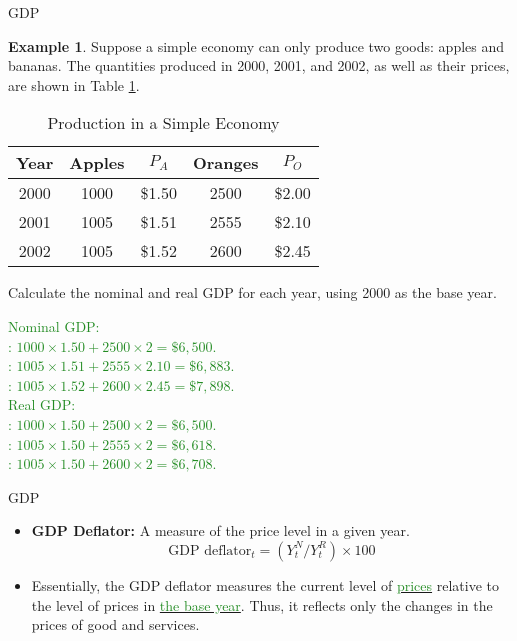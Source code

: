 \documentclass[xcolor={dvipsnames},pdf, hyperref={colorlinks=true, citecolor=ForestGreen, linkcolor=BlueViolet, urlcolor=Magenta}]{beamer}
\theoremstyle{definition}
\newtheorem{exmp}{Example}[section]
\newcommand{\defn}[1]{\textbf{#1}}
\newcommand{\ddp}[1]{{\textcolor{ForestGreen}{#1}}}
\newcommand{\dd}[1]{{\underline{\textcolor{ForestGreen}{#1}}}}
\begin{document}
\begin{frame}{GDP}
\begin{exmp}
	\tiny
	Suppose a simple economy can only produce two goods: apples and bananas. The quantities produced in 2000, 2001, and 2002, as well as their prices, are shown in Table \ref{simp}.
	
	\begin{table}[h!]
		\centering
		\caption{Production in a Simple Economy}
		\label{simp}
		\begin{tabular}{c|c|c|c|c}       
			
			Year & Apples & $P_A$ & Oranges & $P_O$  \\
			\hline
			2000 & 1000 & \$1.50 & 2500 & \$2.00 \\
			2001 & 1005 & \$1.51 & 2555 & \$2.10 \\
			2002 & 1005 & \$1.52 & 2600 & \$2.45 \\
		\end{tabular}
	\end{table} 
	
	Calculate the nominal and real GDP for each year, using 2000 as the base year.

\end{exmp}
\tiny
\ddp{\pause Nominal GDP: \\
	: $1000 \times 1.50 + 2500 \times 2 = \$6,500$. \\ \pause 2001: $1005 \times 1.51 + 2555 \times 2.10 = \$6,883$. \\
	\pause 2002: $1005 \times 1.52 + 2600 \times 2.45 = \$7,898$. \\ 
	\pause Real GDP: \\
	\pause 2000: $1000 \times 1.50 + 2500 \times 2 = \$6,500$. \\ \pause 2001: $1005 \times 1.50 + 2555 \times 2 = \$6,618$. \\
	\pause 2002: $1005 \times 1.50 + 2600 \times 2 = \$6,708$.}
\end{frame}

\begin{frame}{GDP}
\begin{itemize}
	\item \defn{GDP Deflator:} A measure of the price level in a given year. 
	\[\text{GDP deflator$_t$} = (Y^N_t/Y^R_t) \times 100\]
	\item Essentially, the GDP deflator measures the current level of \dd{prices} relative to the level of prices in \dd{the base year}. Thus, it reflects only the changes in the prices of good and services.

	
\end{itemize}
\end{frame}
\end{document}
